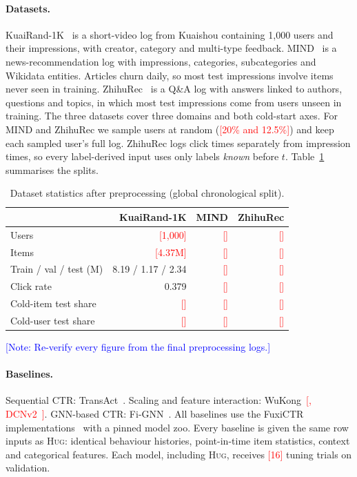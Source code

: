 \documentclass[sigconf,anonymous,review]{acmart}
\newif\ifshownotes \shownotestrue
\newcommand{\tbd}[1]{\textcolor{red}{[#1]}}
\newcommand{\note}[1]{\ifshownotes\textcolor{blue}{[Note: #1]}\fi}
\newcommand{\method}{\textsc{Hug}}      %
\begin{document}
\paragraph{Datasets.}
KuaiRand-1K~\cite{gao2022kuairand} is a short-video log from Kuaishou
containing 1{,}000 users and their impressions, with creator, category and
multi-type feedback. MIND~\cite{wu2020mind} is a news-recommendation log with
impressions, categories, subcategories and Wikidata entities. Articles churn
daily, so most test impressions involve items never seen in training.
ZhihuRec~\cite{hao2021zhihurec} is a Q\&A log with answers linked to authors,
questions and topics, in which most test impressions come from users unseen in
training. The three datasets cover three domains and both cold-start axes. For
MIND and ZhihuRec we sample users at random (\tbd{20\% and 12.5\%}) and keep each
sampled user's full log. ZhihuRec logs click times separately from impression
times, so every label-derived input uses only labels \emph{known} before $t$.
Table~\ref{tab:data} summarises the splits.

\begin{table}[t]
  \caption{Dataset statistics after preprocessing (global chronological split).}
  \label{tab:data}
  \small
  \setlength{\tabcolsep}{3pt}
  \begin{tabular}{lrrr}
    \toprule
    & KuaiRand-1K & MIND & ZhihuRec \\
    \midrule
    Users              & \tbd{1,000} & \tbd{} & \tbd{} \\
    Items              & \tbd{4.37M} & \tbd{} & \tbd{} \\
    Train / val / test (M) & 8.19 / 1.17 / 2.34 & \tbd{} & \tbd{} \\
    Click rate         & 0.379 & \tbd{} & \tbd{} \\
    Cold-item test share & \tbd{} & \tbd{} & \tbd{} \\
    Cold-user test share & \tbd{} & \tbd{} & \tbd{} \\
    \bottomrule
  \end{tabular}
  \note{Re-verify every figure from the final preprocessing logs.}
\end{table}

\paragraph{Baselines.}
Sequential CTR: TransAct~\cite{xia2023transact}. Scaling and feature
interaction: WuKong~\cite{zhang2024wukong}\tbd{, DCNv2~\cite{wang2021dcnv2}}.
GNN-based CTR: Fi-GNN~\cite{li2019fignn}. All baselines use the FuxiCTR
implementations~\cite{zhu2021bars} with a pinned model zoo. Every baseline is
given the same row inputs as \method{}: identical behaviour histories,
point-in-time item statistics, context and categorical features. Each model,
including \method{}, receives \tbd{16} tuning trials on validation.
\end{document}
